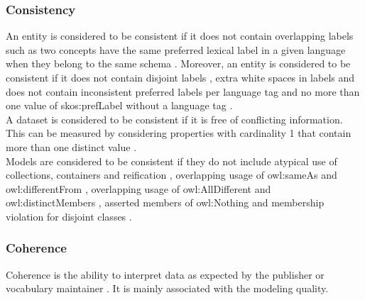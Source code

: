 \documentclass[onecolumn, crcready]{iosart2c}
\begin{document}
\subsubsection{Consistency}

An entity is considered to be consistent if it does not contain overlapping labels such as two concepts have the same preferred lexical label in a given language when they belong to the same schema \cite{skosprimer}\cite{Mader2012}. Moreover, an entity is considered to be consistent if it does not contain disjoint labels \cite{Mader2012}, extra white spaces in labels \cite{Suominen:2012:IQS:2413941.2413985} and does not contain inconsistent preferred labels per language tag and no more than one value of skos:prefLabel without a language tag \cite{Mader2012}\cite{Suominen:2012:IQS:2413941.2413985}.\\ A dataset is considered to be consistent if it is free of conflicting information. This can be measured by considering properties with cardinality 1 that contain more than one distinct value \cite{Mendes2012}.\\ Models are considered to be consistent if they do not include atypical use of collections, containers and reification \cite{Hogan2010}, overlapping usage of owl:sameAs and owl:differentFrom \cite{Hogan2010}, overlapping usage of owl:AllDifferent and owl:distinctMembers \cite{Hogan2010}, asserted members of owl:Nothing and membership violation for disjoint classes \cite{Hogan2010}.

\subsubsection{Coherence}

Coherence is the ability to interpret data as expected by the publisher or vocabulary maintainer \cite{Hogan2010}. It is mainly associated with the modeling quality.\\ 
\end{document}
